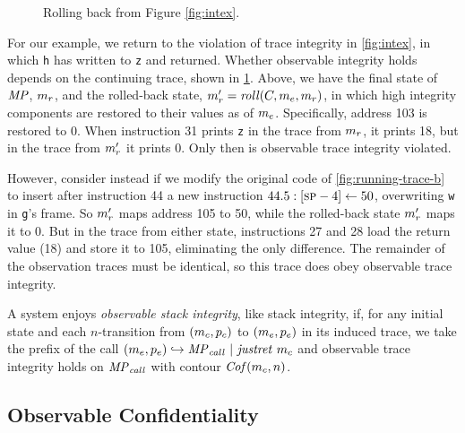 \documentclass[acmsmall,review,anonymous]{acmart}\settopmatter{printfolios=true,printccs=false,printacmref=false}
\begin{document}
{    \begin{figure}
      \integritylazyexample
      \caption{Rolling back from Figure \ref{fig:intex}.}
      \label{fig:intlex}
    \end{figure}

    For our example, we return to the violation of trace integrity in
    \cref{fig:intex}, in which {\tt h} has written to {\tt z} and returned.
    Whether observable integrity holds depends on the continuing trace, shown
    in \cref{fig:intlex}. Above, we have the final state of \(\mathit{MP}\),
    \(m_r\), and the rolled-back state, \(m_r' =
    \mathit{roll}(C,m_e,m_r)\), in which high integrity
    components are restored to their values as of \(m_e\). Specifically,
    address 103 is restored to 0. When instruction 31 prints {\tt z} in the
    trace from \(m_r\), it prints 18, but in the trace from \(m_r'\)
    it prints 0. Only then is observable trace integrity violated.

    However, consider instead if we modify the original code of \cref{fig:running-trace-b} to insert after instruction 44 a new
    instruction \(44.5: [\textsc{sp}-4] \leftarrow 50\), overwriting {\tt w} in
    {\tt g}'s frame. So \(m_r'\) maps address 105 to 50, while the
    rolled-back state \(m_r'\) maps it to 0. But in the trace from either
    state, instructions 27 and 28 load the return value (18) and store it to
    105, eliminating the only difference. The remainder of the observation
    traces must be identical, so this trace does obey observable trace
    integrity.


      A system enjoys {\em observable stack integrity}, like stack integrity,
      if, for any initial state and each \(n\)-transition from
      \((m_c,p_c)\) to \((m_e,p_e)\) in its
      induced trace, we take the prefix of the call
      \((m_e,p_e) \hookrightarrow \mathit{MP}_{\mathit{call}} ~ | ~ \mathit{justret}\ m_c\)
      and observable trace integrity holds on \(\mathit{MP}_{\mathit{call}}\) with
      contour \(\mathit{Cof}(m_c,n)\).

  \subsection{Observable Confidentiality}

}
\end{document}
